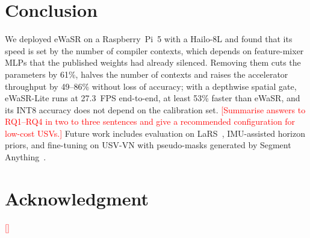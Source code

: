 \documentclass[conference]{IEEEtran}
\newcommand{\tbd}[1]{\textcolor{red}{[#1]}}
\begin{document}
\section{Conclusion}
We deployed eWaSR on a Raspberry~Pi~5 with a Hailo-8L and found that its speed is set by the number of compiler contexts, which depends on feature-mixer MLPs that the published weights had already silenced. Removing them cuts the parameters by 61\%, halves the number of contexts and raises the accelerator throughput by 49--86\% without loss of accuracy; with a depthwise spatial gate, eWaSR-Lite runs at 27.3~FPS end-to-end, at least 53\% faster than eWaSR, and its INT8 accuracy does not depend on the calibration set. \tbd{Summarise answers to RQ1--RQ4 in two to three sentences and give a recommended configuration for low-cost USVs.} Future work includes evaluation on LaRS~\cite{zust2023lars}, IMU-assisted horizon priors, and fine-tuning on USV-VN with pseudo-masks generated by Segment Anything~\cite{kirillov2023sam}.

\section*{Acknowledgment}
\tbd{}



\end{document}
